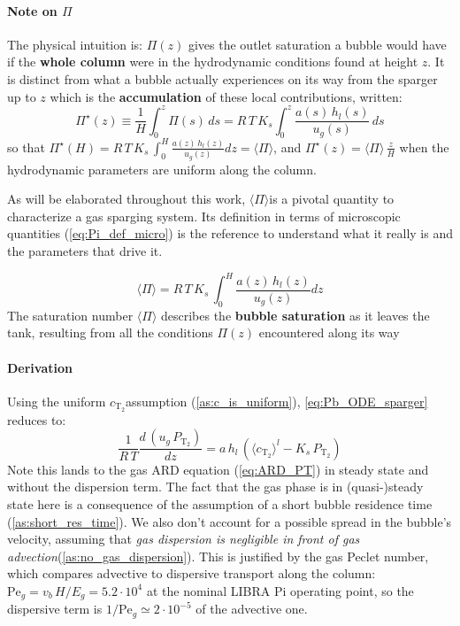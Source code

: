 \documentclass[a4paper,11pt,oneside]{report}
\newcommand{\PT}{\ensuremath{P_\mathrm{T_2}}}
\newcommand{\CT}{\ensuremath{c_\mathrm{T_2}}}
\newcommand{\PI}{\ensuremath{\langle \Pi \rangle}}
\newcounter{assumption}[chapter]
\newcommand{\assumption}[1]{\refstepcounter{assumption}\textit{#1}}
\newenvironment{keyresult}
  {\begin{tcolorbox}[colback=blue!5, colframe=blue!50!black, boxrule=0.5pt, arc=2pt]}
  {\end{tcolorbox}}
\begin{document}
\paragraph{Note on $\Pi$}

The physical intuition is: $\Pi(z)$ gives the outlet saturation a bubble would have if the \textbf{whole column} were in the hydrodynamic conditions found at height $z$. It is distinct from what a bubble actually experiences on its way from the sparger up to $z$ which is the \textbf{accumulation} of these local contributions, written:
\begin{equation}
\label{eq:Pi_cumul}
    \Pi^\star(z)\equiv\frac{1}{H}\int_0^z\Pi(s)\,ds=R\,T\,K_s\int_0^z\frac{a(s)\,h_l(s)}{u_g(s)}\,ds
\end{equation}
so that $\Pi^\star(H)= R\,T\,K_s\,\int_0^H\frac{a(z)\,h_l(z)}{u_g(z)}dz=\langle\Pi\rangle$, and $\Pi^\star(z)=\langle\Pi\rangle\,\frac{z}{H}$ when the hydrodynamic parameters are uniform along the column.

As will be elaborated throughout this work, \PI is a pivotal quantity to characterize a gas sparging system. Its definition in terms of microscopic quantities (\cref{eq:Pi_def_micro}) is the reference to understand what it really is and the parameters that drive it. 

\begin{keyresult}
    \begin{equation}
        \langle\Pi\rangle=R\,T\,K_s\,\int_0^H\frac{a(z)\,h_l(z)}{u_g(z)}dz
    \end{equation}
    The saturation number $\langle\Pi\rangle$ describes the \textbf{bubble saturation} as it leaves the tank, resulting from all the conditions $\Pi(z)$ encountered along its way
\end{keyresult} 


\paragraph{Derivation}
Using the uniform \CT assumption (\cref{as:c_is_uniform}), \cref{eq:Pb_ODE_sparger} reduces to:
\begin{equation}
\label{eq:PT_steady}
    \frac{1}{R\,T}\frac{d\,(u_g\,\PT)}{dz}=a\,h_l\,\left(\langle\CT\rangle^l-K_s\,\PT\right)
\end{equation}
Note this lands to the gas ARD equation (\cref{eq:ARD_PT}) in steady state and without the dispersion term. The fact that the gas phase is in (quasi-)steady state here is a consequence of the assumption of a short bubble residence time (\cref{as:short_res_time}). We also don't account for a possible spread in the bubble's velocity, assuming that \assumption{gas dispersion is negligible in front of gas advection\label{as:no_gas_dispersion}}(\cref{as:no_gas_dispersion}). This is justified by the gas Peclet number, which compares advective to dispersive transport along the column: $\mathrm{Pe}_g=v_b\,H/E_g=5.2\cdot10^{4}$ at the nominal LIBRA Pi operating point, so the dispersive term is $1/\mathrm{Pe}_g\simeq2\cdot10^{-5}$ of the advective one. 
\end{document}
